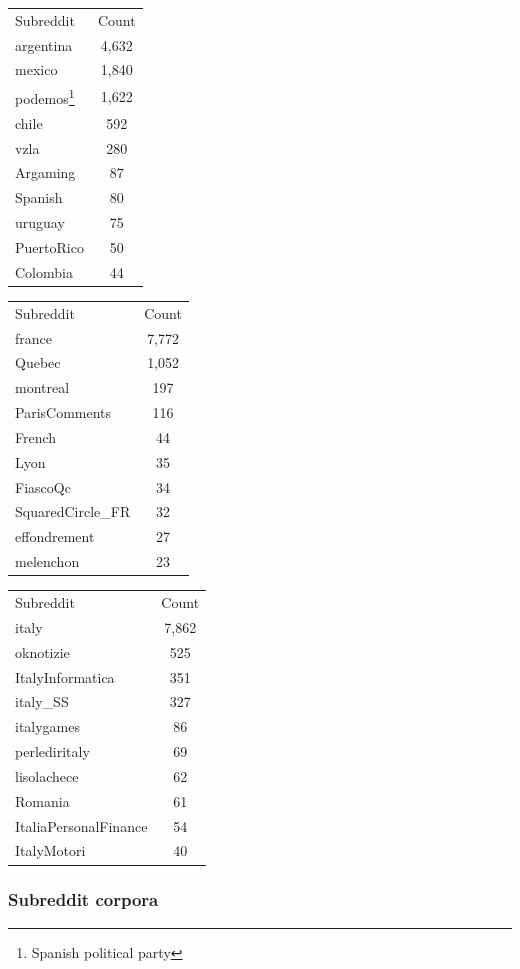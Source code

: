\documentclass[11pt]{article} %
\begin{document}
\begin{tabular}{l|c}
\rowcolor{gray!50} Subreddit & Count  \\
argentina & 4,632 \\
mexico & 1,840 \\
podemos\footnote{Spanish political party} & 1,622 \\
chile & 592 \\
vzla & 280 \\
Argaming & 87 \\
Spanish & 80 \\
uruguay & 75 \\
PuertoRico & 50 \\
Colombia & 44 \\

\end{tabular}
\begin{tabular}{l|c}
\rowcolor{gray!50} Subreddit & Count  \\
france & 7,772 \\
Quebec & 1,052 \\
montreal & 197 \\
ParisComments & 116 \\
French & 44 \\
Lyon  & 35 \\
FiascoQc & 34 \\
SquaredCircle\_FR & 32 \\
effondrement & 27 \\
melenchon & 23 
\end{tabular}
\begin{tabular}{l|c}
\rowcolor{gray!50} Subreddit & Count  \\
italy & 7,862 \\
oknotizie & 525 \\
ItalyInformatica & 351 \\
italy\_SS & 327 \\
italygames & 86 \\
perlediritaly & 69 \\
lisolachece & 62 \\
Romania & 61 \\
ItaliaPersonalFinance & 54 \\
ItalyMotori & 40
\end{tabular}

\subsubsection{Subreddit corpora}
\end{document}
